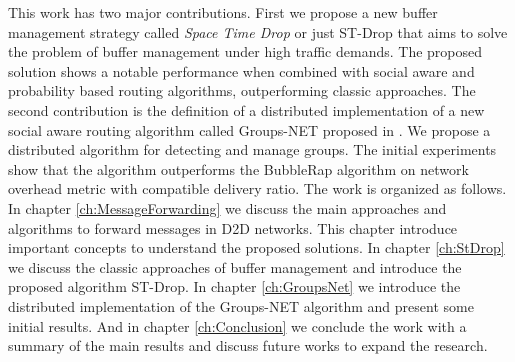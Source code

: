 This work has two major contributions. First we propose a new buffer management strategy called \textit{Space Time Drop} or just ST-Drop that aims to solve the problem of buffer management under high traffic demands.
The proposed solution shows a notable performance when combined with social aware and probability based routing algorithms, outperforming classic approaches.
The second contribution is the definition of a distributed implementation of a new social aware routing algorithm called Groups-NET proposed in \cite{nunes2016leveraging}.
We propose a distributed algorithm for detecting and manage groups. The initial experiments show that the algorithm outperforms the BubbleRap algorithm on network overhead metric with compatible delivery ratio.
The work is organized as follows. In chapter \ref{ch:MessageForwarding} we discuss the main approaches and algorithms to forward messages in D2D networks. This chapter introduce important
concepts to understand the proposed solutions. In chapter \ref{ch:StDrop} we discuss the classic approaches of buffer management and introduce the proposed algorithm ST-Drop.
In chapter \ref{ch:GroupsNet} we introduce the distributed implementation of the Groups-NET algorithm and present some initial results. And in chapter \ref{ch:Conclusion} we conclude the work
with a summary of the main results and discuss future works to expand the research.